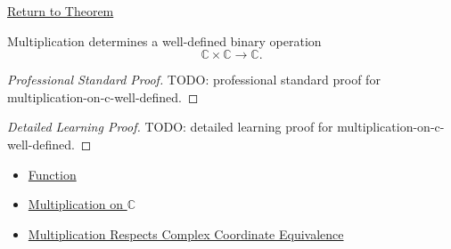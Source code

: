 \newpage
{}
\label{prf:multiplication-on-c-well-defined}

\begin{remark*}[Return]
\hyperref[thm:multiplication-on-c-well-defined]{Return to Theorem}
\end{remark*}

\begin{theorem*}
Multiplication determines a well-defined binary operation
\[
\mathbb{C}\times\mathbb{C}\to\mathbb{C}.
\]
\end{theorem*}

\begin{proof}[Professional Standard Proof]
\LRAProofBodyStart
TODO: professional standard proof for multiplication-on-c-well-defined.
\end{proof}

\begin{proof}[Detailed Learning Proof]
\LRAProofBodyStart
TODO: detailed learning proof for multiplication-on-c-well-defined.
\end{proof}

\begin{remark*}
\end{remark*}

\begin{dependencies}
\begin{itemize}
  \item \hyperref[def:function]{Function}
  \item \hyperref[def:multiplication-on-c-classes]{Multiplication on $\mathbb{C}$}
  \item \hyperref[lem:multiplication-on-c-respects-equivalence]{Multiplication Respects Complex Coordinate Equivalence}
\end{itemize}
\end{dependencies}

\clearpage
